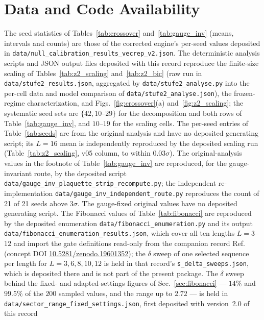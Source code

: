 \documentclass[aps,pra,twocolumn,superscriptaddress,showpacs,floatfix]{revtex4-2}
\begin{document}
\section*{Data and Code Availability}
The seed statistics of Tables~\ref{tab:crossover} and~\ref{tab:gauge_inv} (means, intervals and counts) are those of the corrected engine's per-seed values deposited in \texttt{data/null\_calibration\_results\_vecrep\_v2.json}. The deterministic analysis scripts and JSON output files deposited with this record reproduce the finite-size
scaling of Tables~\ref{tab:z2_scaling} and~\ref{tab:z2_bic} (raw run in
\texttt{data/stufe2\_results.json}, aggregated by
\texttt{data/stufe2\_analyse.py} into the per-cell data and model comparison
of \texttt{data/stufe2\_analyse.json}), the frozen-regime characterization, and
Figs.~\ref{fig:crossover}(a) and~\ref{fig:z2_scaling}; the systematic seed sets
are $\{42, 10\text{--}29\}$ for the decomposition and both rows of Table~\ref{tab:gauge_inv}, and $10\text{--}19$ for the scaling cells. The
per-seed entries of Table~\ref{tab:seeds} are from the original analysis and
have no deposited generating script; its $L = 16$ mean is independently
reproduced by the deposited scaling run (Table~\ref{tab:z2_scaling}, v05
column, to within $0.03\sigma$). The original-analysis values in the footnote of Table~\ref{tab:gauge_inv} are reproduced, for the gauge-invariant route, by the deposited script \texttt{data/gauge\_inv\_plaquette\_strip\_recompute.py}; the independent re-implementation \texttt{data/gauge\_inv\_independent\_route.py} reproduces the count of 21 of 21 seeds above $3\sigma$. The gauge-fixed original values have no deposited generating script. The Fibonacci values of
Table~\ref{tab:fibonacci} are reproduced by the deposited enumeration
\texttt{data/fibonacci\_enumeration.py} and its output
\texttt{data/fibonacci\_enumeration\_results.json}, which cover all ten
lengths $L = 3$--$12$ and import the gate definitions read-only from the
companion record Ref.~\cite{Sayim2026fibonacci} (concept DOI
\href{https://doi.org/10.5281/zenodo.19601352}{10.5281/zenodo.19601352});
the $\delta$ sweep of one selected sequence per length for
$L = 3, 6, 8, 10, 12$ is held in that record's
\texttt{s\_delta\_sweeps.json}, which is deposited there and is not part of
the present package. The $\delta$ sweep behind the fixed- and
adapted-settings figures of Sec.~\ref{sec:fibonacci} --- $14\%$ and $99.5\%$ of
the $200$ sampled values, and the range up to $2.72$ --- is held in
\texttt{data/sector\_range\_fixed\_settings.json}, first deposited with
version~2.0 of this record
\end{document}

